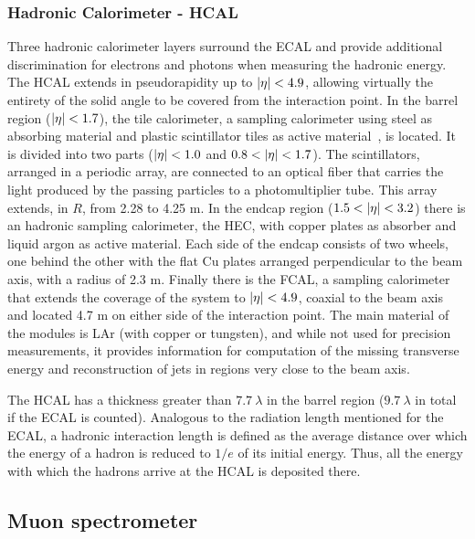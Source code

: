\subsubsection{Hadronic Calorimeter - HCAL}



Three hadronic calorimeter layers surround the \ac{ECAL} and provide additional discrimination for electrons and photons when measuring the hadronic energy. The \ac{HCAL} extends in pseudorapidity up to \(|\eta|<4.9\), allowing virtually the entirety of the solid angle to be covered from the interaction point. In the barrel region (\(|\eta|<1.7\)), the tile calorimeter, a sampling calorimeter using steel as absorbing material and plastic scintillator tiles as active material~\cite{TileTDR}, is located. It is divided into two parts (\(|\eta|<1.0\) and \(0.8<\abseta<1.7\)). The scintillators, arranged in a periodic array, are connected to an optical fiber that carries the light produced by the passing particles to a photomultiplier tube. This array extends, in \(R\), from 2.28 to 4.25 m. In the endcap region (\(1.5<\abseta<3.2\)) there is an hadronic sampling calorimeter, the \ac{HEC}, with copper plates as absorber and liquid argon as active material. Each side of the endcap consists of two wheels, one behind the other with the flat Cu plates arranged perpendicular to the beam axis, with a radius of 2.3 m. Finally there is the \ac{FCAL}, a sampling calorimeter that extends the coverage of the system to \(|\eta|<4.9\), coaxial to the beam axis and located 4.7 m on either side of the interaction point. The main material of the modules is \ac{LAr} (with copper or tungsten), and while not used for precision measurements, it provides information for computation of the missing transverse energy and reconstruction of jets in regions very close to the beam axis.

The \ac{HCAL} has a thickness greater than \(7.7~\lambda\) in the barrel region (\(9.7~\lambda\) in total if the \ac{ECAL} is counted). Analogous to the radiation length mentioned for the \ac{ECAL}, a hadronic interaction length is defined as the average distance over which the energy of a hadron is reduced to \(1/e\) of its initial energy. Thus, all the energy with which the hadrons arrive at the \ac{HCAL} is deposited there.





\subsection{Muon spectrometer}


